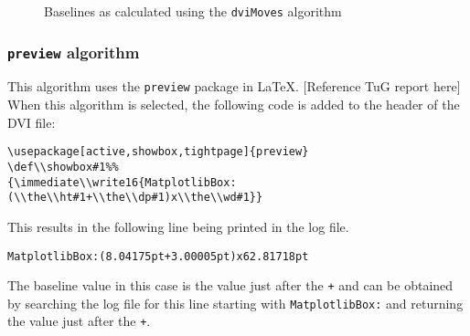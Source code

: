 \documentclass[]{article}
\begin{document}
\begin{figure}
\begin{center}
\vspace{0.3cm}
\end{center}
\caption{Baselines as calculated using the \texttt{dviMoves} algorithm}
\end{figure}

\subsubsection{\texorpdfstring{\texttt{preview}
algorithm}{preview algorithm}}\label{preview-algorithm}

This algorithm uses the \texttt{preview} package in \LaTeX{}.
{[}Reference TuG report here{]} When this algorithm is selected, the
following code is added to the header of the DVI file:

\begin{verbatim}
\usepackage[active,showbox,tightpage]{preview}
\def\\showbox#1%%
{\immediate\\write16{MatplotlibBox:(\\the\\ht#1+\\the\\dp#1)x\\the\\wd#1}}
\end{verbatim}

This results in the following line being printed in the log file.

\begin{verbatim}
MatplotlibBox:(8.04175pt+3.00005pt)x62.81718pt
\end{verbatim}

The baseline value in this case is the value just after the \texttt{+}
and can be obtained by searching the log file for this line starting
with \texttt{MatplotlibBox:} and returning the value just after the
\texttt{+}.
\end{document}
